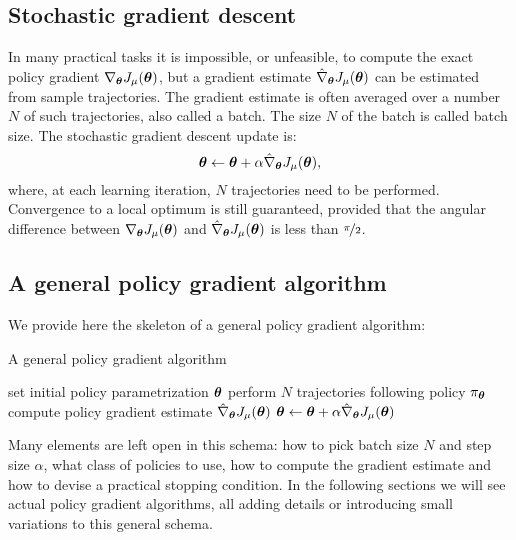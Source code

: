 \subsection{Stochastic gradient descent}
In many practical tasks it is impossible, or unfeasible, to compute the exact policy gradient $\nabla_{\boldsymbol{\theta}}J_\mu(\boldsymbol{\theta})$, but a gradient estimate $\hat{\nabla}_{\boldsymbol{\theta}}J_{\mu}(\boldsymbol{\theta})$ can be estimated from sample trajectories. The gradient estimate is often averaged over a number $N$ of such trajectories, also called a batch. The size $N$ of the batch is called batch size. The stochastic gradient descent update is:
\[
	\boldsymbol{\theta} \gets \boldsymbol{\theta} + \alpha\hat{\nabla}_{\boldsymbol{\theta}}J_{\mu}(\boldsymbol{\theta}),
\]
where, at each learning iteration, $N$ trajectories need to be performed.
Convergence to a local optimum is still guaranteed, provided that the angular difference between $\nabla_{\boldsymbol{\theta}}J_\mu(\boldsymbol{\theta})$ and $\hat{\nabla}_{\boldsymbol{\theta}}J_{\mu}(\boldsymbol{\theta})$ is less than $\nicefrac{\pi}{2}$.

\subsection{A general policy gradient algorithm}
We provide here the skeleton of a general policy gradient algorithm: 
\begin{algorithm}[H]
\caption{A general policy gradient algorithm}\label{alg:general}
\begin{algorithmic}
\State set initial policy parametrization $\boldsymbol{\theta}$
\State perform $N$ trajectories following policy $\pi_{\boldsymbol{\theta}}$
\State compute policy gradient estimate $\hat{\nabla}_{\boldsymbol{\theta}}J_{\mu}(\boldsymbol{\theta})$
\State $\boldsymbol{\theta} \gets \boldsymbol{\theta} + \alpha\hat{\nabla}_{\boldsymbol{\theta}}J_{\mu}(\boldsymbol{\theta})$
\EndWhile
\end{algorithmic}
\end{algorithm}
Many elements are left open in this schema: how to pick batch size $N$ and step size $\alpha$, what class of policies to use, how to compute the gradient estimate and how to devise a practical stopping condition. In the following sections we will see actual policy gradient algorithms, all adding details or introducing small variations to this general schema.

